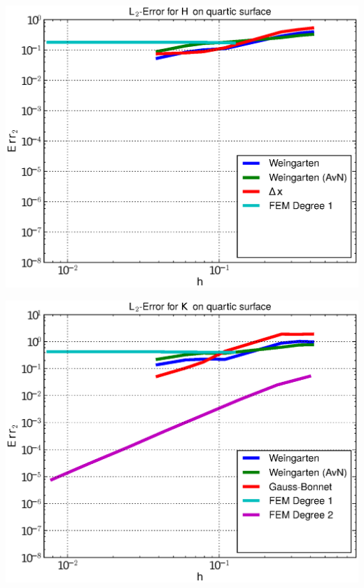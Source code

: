 \documentclass{beamer}
\begin{document}
\begin{frame}
\begin{overprint}
\begin{minipage}[t]{0.49\textwidth}
            \centering\includegraphics[width=\textwidth]{bilder/Curvature/heineB/ErrHL2_4.eps}
          \end{minipage}
          \begin{minipage}[t]{0.49\textwidth}
            \centering\includegraphics[width=\textwidth]{bilder/Curvature/heineB/ErrKL2_5.eps}
          \end{minipage}\hfill
          \begin{minipage}[t]{0.49\textwidth}

\end{minipage}
\end{overprint}
\end{frame}
\end{document}
